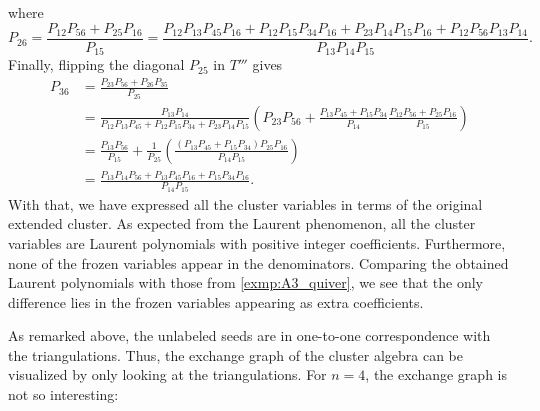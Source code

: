 \begin{example}
	where
	\begin{equation*}
		P_{26} = \frac{P_{12}P_{56} + P_{25}P_{16}}{P_{15}} = \frac{P_{12}P_{13}P_{45}P_{16} + P_{12}P_{15}P_{34}P_{16}+P_{23}P_{14}P_{15}P_{16} + P_{12}P_{56}P_{13}P_{14}}{P_{13}P_{14}P_{15}}.
	\end{equation*}
	Finally, flipping the diagonal $P_{25}$ in $T'''$ gives
	\begin{align*}
		P_{36}
		 & = \frac{P_{23}P_{56} + P_{26}P_{35}}{P_{25}}                                                                                                                                                      \\
		 & = \frac{P_{13}P_{14}}{P_{12}P_{13}P_{45} + P_{12}P_{15}P_{34}+P_{23}P_{14}P_{15}}\left(P_{23}P_{56} + \frac{P_{13}P_{45} + P_{15}P_{34}}{P_{14}}\frac{P_{12}P_{56} + P_{25}P_{16}}{P_{15}}\right) \\
		 & = \frac{P_{13}P_{56}}{P_{15}} + \frac{1}{P_{25}}\left(\frac{(P_{13}P_{45} + P_{15}P_{34})P_{25}P_{16}}{P_{14}P_{15}}\right)                                                                       \\
		 & =\frac{P_{13}P_{14}P_{56} + P_{13}P_{45}P_{16} + P_{15}P_{34}P_{16}}{P_{14}P_{15}}.
	\end{align*}
	With that, we have expressed all the cluster variables in terms of the original
	extended cluster. As expected from the Laurent phenomenon, all the cluster variables
	are Laurent polynomials with positive integer coefficients. Furthermore, none of the
	frozen variables appear in the denominators. Comparing the obtained Laurent polynomials
	with those from \cref{exmp:A3_quiver}, we see that the only difference lies in the
	frozen variables appearing as extra coefficients.

	As remarked above, the unlabeled seeds are in one-to-one correspondence with the
	triangulations. Thus, the exchange graph of the cluster algebra can be visualized by
	only looking at the triangulations. For $n = 4$, the exchange graph is not so
	interesting:
	\begin{center}
\end{center}
\end{example}
